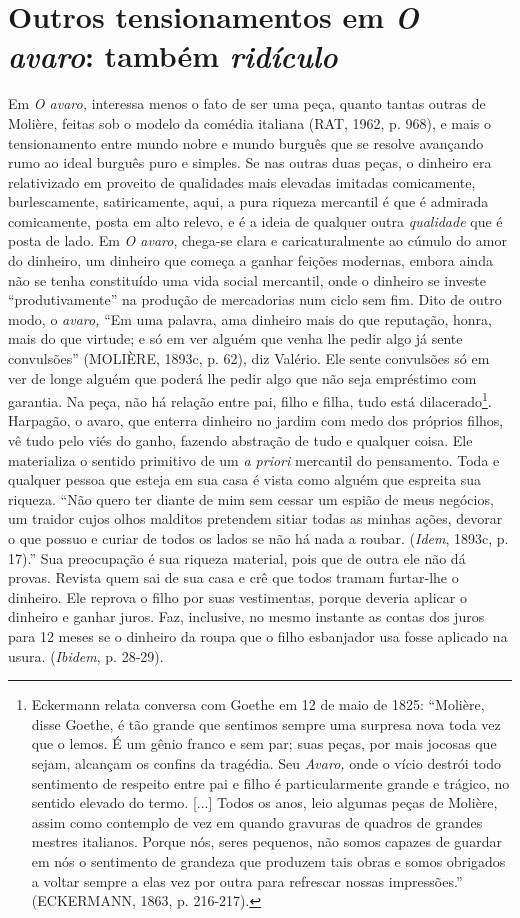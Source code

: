 \section{Outros tensionamentos em \emph{O avaro}: também \emph{ridículo}}

Em \emph{O avaro,} interessa menos o fato de ser uma peça, quanto tantas
outras de Molière, feitas sob o modelo da comédia italiana (RAT, 1962,
p. 968), e mais o tensionamento entre mundo nobre e mundo burguês que se
resolve avançando rumo ao ideal burguês puro e simples. Se nas outras
duas peças, o dinheiro era relativizado em proveito de qualidades mais
elevadas imitadas comicamente, burlescamente, satiricamente, aqui, a
pura riqueza mercantil é que é admirada comicamente, posta em alto
relevo, e é a ideia de qualquer outra \emph{qualidade} que é posta de
lado. Em \emph{O avaro}, chega-se clara e caricaturalmente ao cúmulo do
amor do dinheiro, um dinheiro que começa a ganhar feições modernas,
embora ainda não se tenha constituído uma vida social mercantil, onde o
dinheiro se investe ``produtivamente'' na produção de mercadorias num
ciclo sem fim. Dito de outro modo, o \emph{avaro,} ``Em uma palavra, ama
dinheiro mais do que reputação, honra, mais do que virtude; e só em ver
alguém que venha lhe pedir algo já sente convulsões'' (MOLIÈRE, 1893c,
p. 62), diz Valério. Ele sente convulsões só em ver de longe alguém que
poderá lhe pedir algo que não seja empréstimo com garantia. Na peça, não
há relação entre pai, filho e filha, tudo está dilacerado\footnote{Eckermann
  relata conversa com Goethe em 12 de maio de 1825: ``Molière, disse
  Goethe, é tão grande que sentimos sempre uma surpresa nova toda vez
  que o lemos. É um gênio franco e sem par; suas peças, por mais jocosas
  que sejam, alcançam os confins da tragédia. Seu \emph{Avaro,} onde o
  vício destrói todo sentimento de respeito entre pai e filho é
  particularmente grande e trágico, no sentido elevado do termo.
  {[}...{]} Todos os anos, leio algumas peças de Molière, assim como
  contemplo de vez em quando gravuras de quadros de grandes mestres
  italianos. Porque nós, seres pequenos, não somos capazes de guardar em
  nós o sentimento de grandeza que produzem tais obras e somos obrigados
  a voltar sempre a elas vez por outra para refrescar nossas
  impressões.'' (ECKERMANN, 1863, p. 216-217).}. Harpagão, o avaro, que
enterra dinheiro no jardim com medo dos próprios filhos, vê tudo pelo
viés do ganho, fazendo abstração de tudo e qualquer coisa. Ele
materializa o sentido primitivo de um \emph{a priori} mercantil do
pensamento. Toda e qualquer pessoa que esteja em sua casa é vista como
alguém que espreita sua riqueza. ``Não quero ter diante de mim sem
cessar um espião de meus negócios, um traidor cujos olhos malditos
pretendem sitiar todas as minhas ações, devorar o que possuo e curiar de
todos os lados se não há nada a roubar. (\emph{Idem}, 1893c, p. 17).''
Sua preocupação é sua riqueza material, pois que de outra ele não dá
provas. Revista quem sai de sua casa e crê que todos tramam furtar-lhe o
dinheiro. Ele reprova o filho por suas vestimentas, porque deveria
aplicar o dinheiro e ganhar juros. Faz, inclusive, no mesmo instante as
contas dos juros para 12 meses se o dinheiro da roupa que o filho
esbanjador usa fosse aplicado na usura. (\emph{Ibidem}, p. 28-29).

